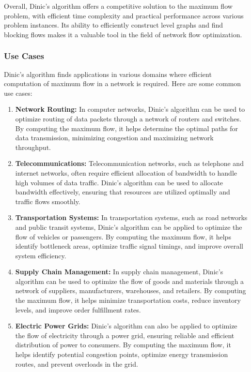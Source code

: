 \documentclass[12pt]{book} %
\begin{document}
Overall, Dinic's algorithm offers a competitive solution to the maximum flow problem, with efficient time complexity and practical performance across various problem instances. Its ability to efficiently construct level graphs and find blocking flows makes it a valuable tool in the field of network flow optimization.

\subsubsection{Use Cases}
Dinic's algorithm finds applications in various domains where efficient computation of maximum flow in a network is required. Here are some common use cases:

\begin{enumerate}
    \item \textbf{Network Routing:} In computer networks, Dinic's algorithm can be used to optimize routing of data packets through a network of routers and switches. By computing the maximum flow, it helps determine the optimal paths for data transmission, minimizing congestion and maximizing network throughput.
    
    \item \textbf{Telecommunications:} Telecommunication networks, such as telephone and internet networks, often require efficient allocation of bandwidth to handle high volumes of data traffic. Dinic's algorithm can be used to allocate bandwidth effectively, ensuring that resources are utilized optimally and traffic flows smoothly.
    
    \item \textbf{Transportation Systems:} In transportation systems, such as road networks and public transit systems, Dinic's algorithm can be applied to optimize the flow of vehicles or passengers. By computing the maximum flow, it helps identify bottleneck areas, optimize traffic signal timings, and improve overall system efficiency.
    
    \item \textbf{Supply Chain Management:} In supply chain management, Dinic's algorithm can be used to optimize the flow of goods and materials through a network of suppliers, manufacturers, warehouses, and retailers. By computing the maximum flow, it helps minimize transportation costs, reduce inventory levels, and improve order fulfillment rates.
    
    \item \textbf{Electric Power Grids:} Dinic's algorithm can also be applied to optimize the flow of electricity through a power grid, ensuring reliable and efficient distribution of power to consumers. By computing the maximum flow, it helps identify potential congestion points, optimize energy transmission routes, and prevent overloads in the grid.
\end{enumerate}
\end{document}
